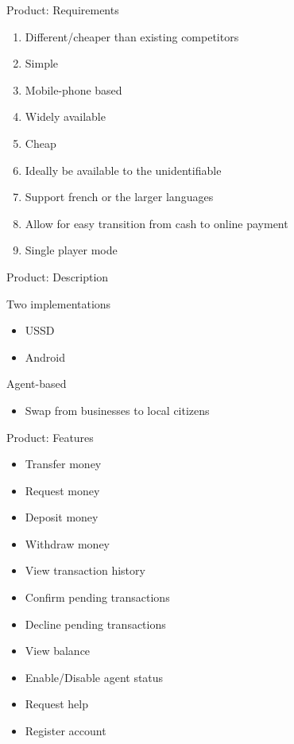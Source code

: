 \documentclass[10pt]{beamer}
\newenvironment{wideitemize}{\itemize\addtolength{\itemsep}{10pt}}{\enditemize}
\begin{document}
\begin{frame}{Product: Requirements}
\begin{enumerate}
    \item Different/cheaper than existing competitors
    \item Simple
    \item Mobile-phone based
    \item Widely available
    \item Cheap
    \item Ideally be available to the unidentifiable
    \item Support french or the larger languages
    \item Allow for easy transition from cash to online payment
    \item Single player mode
\end{enumerate}
\end{frame}

\begin{frame}{Product: Description}
\begin{wideitemize}
    \item Two implementations
    \begin{itemize}
        \item USSD
        \item Android
    \end{itemize}
    \item Agent-based
    \begin{itemize}
        \item Swap from businesses to local citizens
    \end{itemize}
\end{wideitemize}
\end{frame}

\begin{frame}{Product: Features}
\begin{itemize}
    \item Transfer money
    \item Request money
    \item Deposit money
    \item Withdraw money
    \item View transaction history
    \item Confirm pending transactions
    \item Decline pending transactions
    \item View balance
    \item Enable/Disable agent status
    \item Request help
    \item Register account
\end{itemize}
\end{frame}
\end{document}
